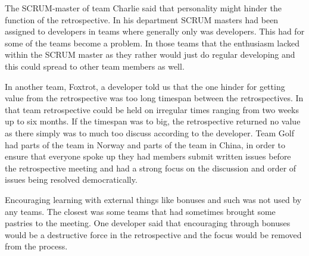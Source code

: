 \label{question-7}
The SCRUM-master of team Charlie said that personality might hinder the function of the retrospective. In his department SCRUM masters had been assigned to developers in teams where generally only was developers. This had for some of the teams become a problem. In those teams that the enthusiasm lacked within the SCRUM master as they rather would just do regular developing and this could spread to other team members as well. 

In another team, Foxtrot, a developer told us that the one hinder for getting value from the retrospective was too long timespan between the retrospectives. In that team retrospective could be held on irregular times ranging from two weeks up to six months. If the timespan was to big, the retrospective returned no value as there simply was to much too discuss according to the developer. Team Golf had parts of the team in Norway and parts of the team in China, in order to ensure that everyone spoke up they had members submit written issues before the retrospective meeting and had a strong focus on the discussion and order of issues being resolved democratically. 

\begin{table}[!h]
	\begin{center}
	\caption{Value Decreasing Hinders for the Retrospective}
	\label{table:value-decreasing-hinders}
	\end{center}
\end{table}

\label{question-9}
Encouraging learning with external things like bonuses and such was not used by any teams. The closest was some teams that had sometimes brought some pastries to the meeting. One developer said that encouraging through bonuses would be a destructive force in the retrospective and the focus would be removed from the process.

